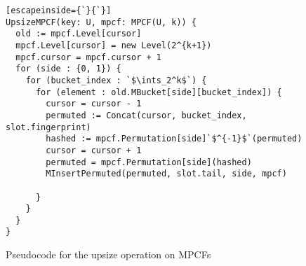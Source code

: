 \documentclass[letterpaper, 11pt]{article}
\newcommand{\ints}{\mathbb{Z}}
\begin{document}
\begin{figure}
\begin{lstlisting}[escapeinside={`}{`}]
UpsizeMPCF(key: U, mpcf: MPCF(U, k)) {
  old := mpcf.Level[cursor]
  mpcf.Level[cursor] = new Level(2^{k+1})
  mpcf.cursor = mpcf.cursor + 1
  for (side : {0, 1}) {
    for (bucket_index : `$\ints_2^k$`) {
      for (element : old.MBucket[side][bucket_index]) {
        cursor = cursor - 1
        permuted := Concat(cursor, bucket_index, slot.fingerprint)
        hashed := mpcf.Permutation[side]`$^{-1}$`(permuted)
        cursor = cursor + 1
        permuted = mpcf.Permutation[side](hashed)
        MInsertPermuted(permuted, slot.tail, side, mpcf)

      }
    }
  }
}
\end{lstlisting}
\caption{Pseudocode for the upsize operation on MPCFs}
\end{figure}
\end{document}
